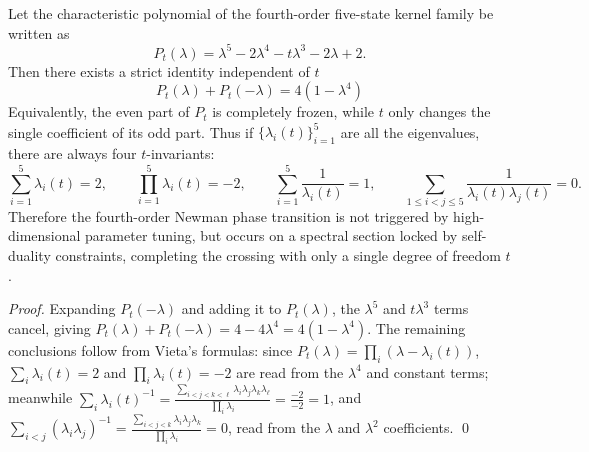 \begin{proposition}\label{prop:pom-a4t-spectral-selfduality-invariants}
Let the characteristic polynomial of the fourth-order five-state kernel family be written as
\[
P_t(\lambda)=\lambda^5-2\lambda^4-t\lambda^3-2\lambda+2.
\]
Then there exists a strict identity independent of \(t\)
\[
\boxed{\;P_t(\lambda)+P_t(-\lambda)=4(1-\lambda^4)\;}
\]
Equivalently, the even part of \(P_t\) is completely frozen, while \(t\) only changes the single coefficient of its odd part.
Thus if \(\{\lambda_i(t)\}_{i=1}^5\) are all the eigenvalues, there are always four \(t\)-invariants:
\[
\sum_{i=1}^5 \lambda_i(t)=2,\qquad
\prod_{i=1}^5 \lambda_i(t)=-2,\qquad
\sum_{i=1}^5 \frac{1}{\lambda_i(t)}=1,\qquad
\sum_{1\le i<j\le 5}\frac{1}{\lambda_i(t)\lambda_j(t)}=0.
\]
Therefore the fourth-order Newman phase transition is not triggered by high-dimensional parameter tuning, but occurs on a spectral section locked by self-duality constraints, completing the crossing with only a single degree of freedom \(t\).
\end{proposition}
\begin{proof}
Expanding \(P_t(-\lambda)\) and adding it to \(P_t(\lambda)\), the \(\lambda^5\) and \(t\lambda^3\) terms cancel, giving
\(
P_t(\lambda)+P_t(-\lambda)=4-4\lambda^4=4(1-\lambda^4)
\).
The remaining conclusions follow from Vieta's formulas: since \(P_t(\lambda)=\prod_i(\lambda-\lambda_i(t))\),
\(\sum_i\lambda_i(t)=2\) and \(\prod_i\lambda_i(t)=-2\) are read from the \(\lambda^4\) and constant terms;
meanwhile
\(
\sum_i \lambda_i(t)^{-1}=\frac{\sum_{i<j<k<\ell}\lambda_i\lambda_j\lambda_k\lambda_\ell}{\prod_i\lambda_i}
=\frac{-2}{-2}=1
\),
and
\(
\sum_{i<j}(\lambda_i\lambda_j)^{-1}
=\frac{\sum_{i<j<k}\lambda_i\lambda_j\lambda_k}{\prod_i\lambda_i}
=0
\),
read from the \(\lambda\) and \(\lambda^2\) coefficients. \qed
\end{proof}

